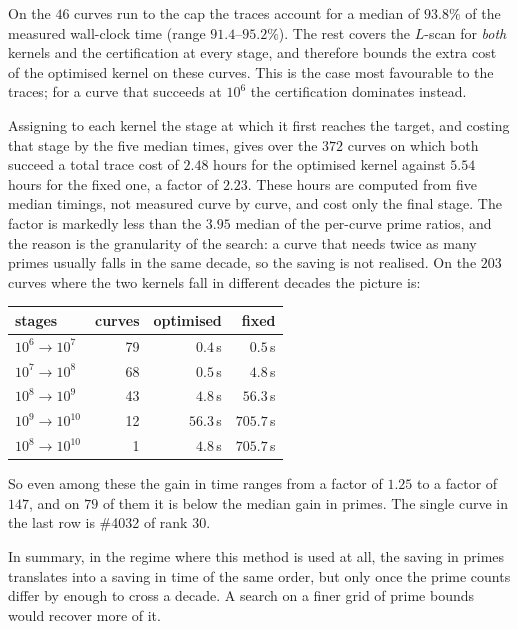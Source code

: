 \documentclass[11pt]{amsart}
\theoremstyle{remark}
\theoremstyle{definition}
\begin{document}
On the $46$ curves run to the cap the traces account for a median of $93.8\%$ of the measured wall-clock time (range $91.4$--$95.2\%$). The rest covers the $L$-scan for \emph{both} kernels and the certification at
every stage, and therefore bounds the extra cost of the optimised kernel on these curves. This is the case most favourable to the traces; for a curve that succeeds at
$10^6$ the certification dominates instead.

Assigning to each kernel the stage at which it first reaches the target, and costing that stage by
the five median times, gives over the $372$ curves on which both succeed a total trace cost of
$2.48$ hours for the optimised kernel against $5.54$ hours for the fixed one, a factor of $2.23$.
These hours are computed from five median timings, not measured curve by curve, and cost only the final stage. The factor is markedly
less than the $3.95$ median of the per-curve prime ratios, and the reason is the granularity of the
search: a curve that needs twice as many primes usually falls in the same decade, so the saving is
not realised. On the $203$ curves where the two kernels fall in different decades the picture is:

\begin{center}\small
\begin{tabular}{lrrr}
\toprule
stages & curves & optimised & fixed\\
\midrule
$10^6\to10^7$ & 79 & $0.4$\,s & $0.5$\,s\\
$10^7\to10^8$ & 68 & $0.5$\,s & $4.8$\,s\\
$10^8\to10^9$ & 43 & $4.8$\,s & $56.3$\,s\\
$10^9\to10^{10}$ & 12 & $56.3$\,s & $705.7$\,s\\
$10^8\to10^{10}$ & 1 & $4.8$\,s & $705.7$\,s\\
\bottomrule
\end{tabular}
\end{center}

\noindent
So even among these the gain in time ranges from a factor of $1.25$ to a factor of $147$, and on $79$ of
them it is below the median gain in primes. The single curve in the last row is \#4032 of rank $30$.

In summary, in the regime where this method is used at all, the saving in
primes translates into a saving in time of the same order, but only once the prime counts differ
by enough to cross a decade. A search on a finer grid of prime bounds would recover more of it.
\end{document}
